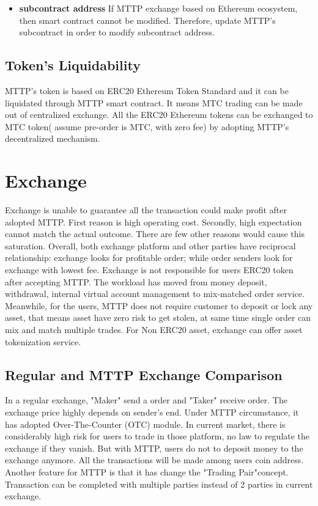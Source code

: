 \documentclass[UTF8,nofonts]{article}
\begin{document}
\begin{itemize}
   \item \textbf{subcontract address} If MTTP exchange based on Ethereum ecosystem,  then smart contract cannot be modified. Therefore,  update MTTP's subcontract in order to modify subcontract address.
 \end{itemize}


\subsection{Token's Liquidability}

MTTP's token is based on ERC20 Ethereum Token Standard and it can be liquidated through MTTP smart contract. It means MTC trading can be made out of centralized exchange. All the ERC20 Ethereum tokens can be exchanged to MTC token( assume pre-order is MTC,  with zero fee) by adopting MTTP's decentralized mechanism.


\section{Exchange\label{sec: exchange}}

Exchange is unable to guarantee all the transaction could make profit after adopted MTTP. First reason is high operating cost. Secondly,  high expectation cannot match the actual outcome. There are few other reasons would cause this saturation. Overall,  both exchange platform and other parties have reciprocal relationship: exchange looks for profitable order; while order senders look for exchange with lowest fee.
Exchange is not responsible for users ERC20 token after accepting MTTP. The workload has moved from money deposit,  withdrawal,  internal virtual account management to mix-matched order service. Meanwhile,  for the users,  MTTP does not require customer to deposit or lock any asset, that means asset have zero risk to get stolen, at same time single order can mix and match multiple trades.
For Non ERC20 asset,  exchange can offer asset tokenization service.

\subsection{Regular and MTTP Exchange Comparison}
In a regular exchange,  "Maker" send a order and "Taker" receive order. The exchange price highly depends on sender's end. Under MTTP circumstance,  it has adopted Over-The-Counter (OTC) module.
In current market,  there is considerably high risk for users to trade in those platform,  no law to regulate the exchange if they vanish. But with MTTP,  users do not to deposit money to the exchange anymore. All the transactions will be made among users coin address.
Another feature for MTTP is that it has change the "Trading Pair"concept. Transaction can be completed with multiple parties instead of 2 parties in current exchange.
\end{document}
